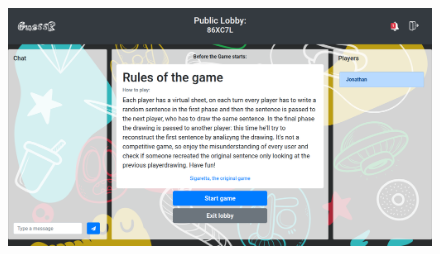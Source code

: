 \begin{figure}[H]
  \centering
  \begin{minipage}[b]{0.75\textwidth}
    \includegraphics[width=\textwidth]{img/screen/inlobby.png}
  \end{minipage}
  \hfill
  \begin{minipage}[b]{0.2\textwidth}

\end{minipage}
\end{figure}
